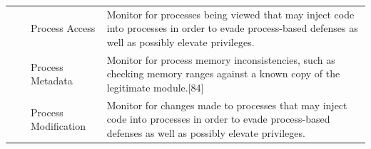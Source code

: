 \documentclass{article}
\begin{document}
\begin{table}[h!]
\begin{tabular}{ |p{1.2cm}||p{2cm}|p{3cm}|p{8cm}|  }
        & & Process Access & Monitor for processes being viewed that may inject code into processes in order to
                             evade process-based defenses as well as possibly elevate privileges. \\
        & & Process Metadata & Monitor for process memory inconsistencies, such as checking memory ranges against a
                               known copy of the legitimate module.[84] \\
        & & Process Modification & Monitor for changes made to processes that may inject code into processes in order
                                   to evade process-based defenses as well as possibly elevate privileges. \\
  \hline
\end{tabular}
\label{table: Detection}
\end{table}

\pagebreak

\subsubsection{}
\textcite{Hosseini:2017}
\end{document}
